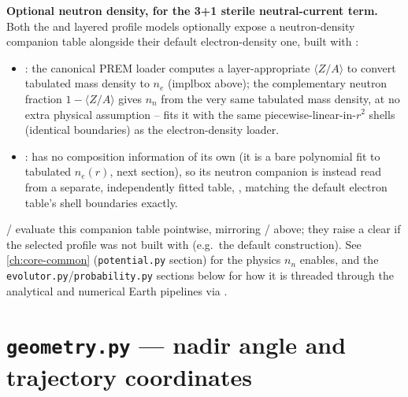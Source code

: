 \begin{implbox}
\textbf{Optional neutron density, for the 3+1 sterile neutral-current
term.} Both the  and  layered profile
models optionally expose a neutron-density companion table alongside their
default electron-density one, built with :
\begin{itemize}
  \item \textbf{}: the canonical PREM loader computes a
    layer-appropriate $\langle Z/A\rangle$ to convert tabulated mass density
    to $n_e$ (implbox above); the complementary neutron fraction
    $1-\langle Z/A\rangle$ gives $n_n$ from the very same tabulated mass
    density, at no extra physical assumption --
     fits it with the same
    piecewise-linear-in-$r^2$ shells (identical  boundaries) as the
    electron-density loader.
  \item \textbf{}: has no composition information of its
    own (it is a bare polynomial fit to tabulated $n_e(r)$, next section),
    so its neutron companion is instead read from a separate, independently
    fitted table, , matching the
    default electron table's shell boundaries exactly.
\end{itemize}
 /  evaluate this companion table pointwise, mirroring
/ above; they raise a clear
 if the selected profile was not built with
 (e.g.\ the default 
construction). See \cref{ch:core-common} (\texttt{potential.py} section) for
the physics $n_n$ enables, and the \texttt{evolutor.py}/\texttt{probability.py}
sections below for how it is threaded through the analytical and numerical
Earth pipelines via .
\end{implbox}

\section{\texttt{geometry.py} --- nadir angle and trajectory coordinates}
\label{sec:earth-geometry}


